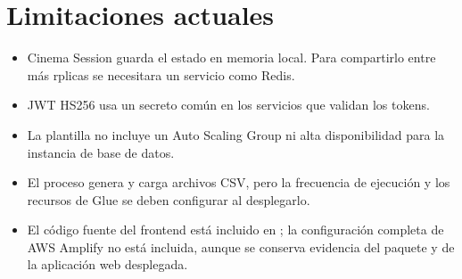 ﻿\chapter{Limitaciones actuales}
\begin{itemize}
\item Cinema Session guarda el estado en memoria local. Para compartirlo entre más rplicas se necesitara un servicio como Redis.
\item JWT HS256 usa un secreto común en los servicios que validan los tokens.
\item La plantilla no incluye un Auto Scaling Group ni alta disponibilidad para la instancia de base de datos.
\item El proceso genera y carga archivos CSV, pero la frecuencia de ejecución y los recursos de Glue se deben configurar al desplegarlo.
\item El código fuente del frontend está incluido en ; la configuración completa de AWS Amplify no está incluida, aunque se conserva evidencia del paquete y de la aplicación web desplegada.
\end{itemize}
